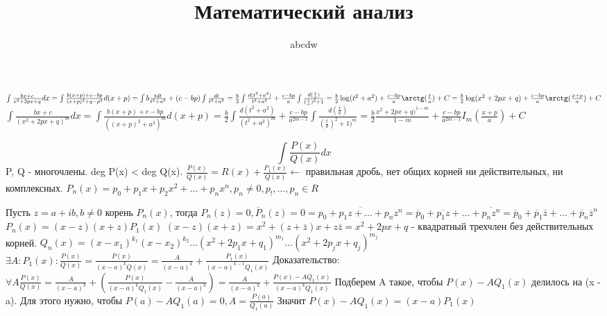 \documentclass[12pt]{article}
\title{Математический анализ}
\date{}
\author{abcdw}
\begin{document}
    \maketitle
    $\int \frac{bx + c}{x^2 + 2px + q} dx = \int \frac{b(x+p) + c - bp}{(x+p)^2 + q - p^2} d(x+p) = \int b \frac{t dt}{t^2 + a^2} + (c - bp) \int \frac{dt}{t^2 + a^2} = \frac{b}2 \int \frac{d(t^2 + a^2)}{t^2 + a^2} + \frac{c-bp}{a} \int \frac{d(\frac{t}a)}{(\frac{t}{a})^2 + 1} = \frac{b}2\log(t^2 + a^2) + \frac{c-bp}a \arctg(\frac{t}{a}) + C = \frac{b}2 \log(x^2 + 2px + q) + \frac{c-bp}a \arctg(\frac{x+p}a) + C$ \newline
    $\int \frac{bx + c}{(x^2 + 2px + q)^m} dx = \int \frac{b(x+p) + c - bp}{((x+p)^2 + a^2)^m} d(x+p) = \frac{b}2 \int \frac{d(t^2 + a^2)}{(t^2 + a^2)^m} + \frac{c - bp}{a ^{2m - 1}} \int \frac{d(\frac{t}a)}{(\frac{t}a)^2 + 1)^m} = \frac{b}2\frac{x^2 + 2px +q)^{1-m}}{1 - m} + \frac{c-bp}{a^{2m - 1}} I_m (\frac{x+p}a) + C$ \newline

    $$\int \frac{P(x)}{Q(x)}dx$$ \newline
    P, Q - многочлены. deg P(x) < deg Q(x). \newline
    $\frac{P(x)}{Q(x)} = R(x) + \frac{P_1(x)}{Q(x)} \leftarrow$ правильная дробь, нет общих корней ни действительных, ни комплексных. \newline
    $P_n(x) = p_0 + p_1 x + p_2 x^2 + \dots + p_n x^n, p_n \not = 0, p_!, \dots, p_n \in R$ \newline

    Пусть $z = a + ib, b \not = 0$ корень $P_n(x)$, тогда $P_n(z) = 0, \overline P_n(z) = 0 = \overline{p_0 + p_1 z + \dots + p_n z^n} = \overline p_0 + \overline {p_1 z} + \dots + \overline{p_n z^n} = \overline p_0 + \overline{p}_1 \overline{z} + \dots + \overline{p}_n \overline{z}^n$ \newline
    $P_n(x) = (x - z)(x + z)P_1(x)$ \newline
    $(x - z)(x + z) = x^2 + (z + \overline z)x + z\overline z = x^2 + 2px + q$ - квадратный трехчлен без действительных корней. \newline
    $Q_n(x) = (x - x_1)^{k_1}(x - x_2)^{k_2} \dots (x^2 + 2p_1x + q_1)^{m_1}\dots (x^2 + 2p_jx + q_j)^{m_j}$ \newline
    $\exists A: P_1(x): \frac{P(x)}{Q(x)} = \frac{P(x)}{(x-a)^kQ(x)} = \frac{A}{(x-a)^k} + \frac{P_1(x)}{(x-a)^{k-1}Q_1(x)}$ \newline
    Доказательство: $\forall A \frac{P(x)}{Q(x)} = \frac{A}{(x - a)^k} + \left(\frac{P(x)}{(x-a)^kQ_1(x)} - \frac{A}{(x-a)^k}\right) = \frac{A}{(x-a)^k} + \frac{P(x) - A Q_1(x)}{(x-a)^kQ_1(x)}$ \newline
    Подберем A такое, чтобы $P(x) - AQ_1(x)$ делилось на (x - a). Для этого нужно, чтобы $P(a) - AQ_1(a) = 0, A = \frac{P(a)}{Q_1(a)}$ \newline
    Значит $P(x) - AQ_1(x) = (x - a)P_1(x)$ \newline
\end{document}
